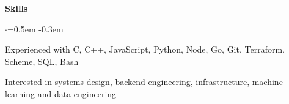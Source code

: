 \documentclass{resume} %
\DeclareRobustCommand{\&}{%
  \ifdim\fontdimen1\font>0pt
    \textsl{\symbol{`\&}}%
  \else
    \symbol{`\&}%
  \fi
}
\begin{document}

\begin{rSection}{\textbf{Skills}}
  \vspace {0.3em} 
  \begin{list}{$\cdot$}{\leftmargin=0.5em}
    \itemsep -0.3em \vspace{-0.3em}
    \item Experienced with C, C++, JavaScript, Python, Node, Go, Git, Terraform, Scheme, SQL, Bash
    \item Interested in systems design, backend engineering, infrastructure, machine learning and data engineering
  \end{list}
  \vspace{0.3em}
\end{rSection}

\end{document}
